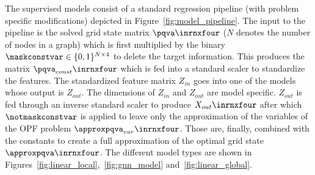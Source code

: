 The supervised models consist of a standard regression pipeline (with problem specific modifications) depicted in
Figure~\ref{fig:model_pipeline}.
The input to the pipeline is the solved grid state matrix $\pqva \inrnxfour$ ($N$ denotes the number of nodes in a graph) which
is first multiplied by the binary $\maskconstvar \in \{0, 1\}^{N \times 4}$ to delete the target information.
This produces the matrix $\pqva_{const} \inrnxfour$ which is fed into a standard scaler to standardize the features.
The standardized feature matrix $Z_{in}$ goes into one of the models whose output is $Z_{out}$.
The dimensions of $Z_{in}$ and $Z_{out}$ are model specific.
$Z_{out}$ is fed through an inverse
standard scaler to produce $X_{out} \inrnxfour$ after which $\notmaskconstvar$ is applied to leave only the
approximation of the variables of the OPF problem $\approxpqva_{var} \inrnxfour$.
Those are, finally, combined with the constants to create a full approximation of the optimal grid state $\approxpqva \inrnxfour$.
The different model types are shown in Figures~\ref{fig:linear_local},~\ref{fig:gnn_model} and~\ref{fig:linear_global}.

\mbox{}\\

